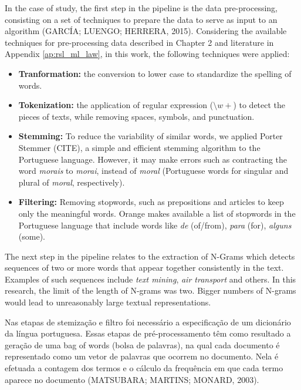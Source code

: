 In the case of study, the first step in the pipeline is the data pre-processing, consisting on a set of techniques to prepare the data to serve as input to an algorithm (GARCÍA; LUENGO; HERRERA, 2015). Considering the available techniques for pre-processing data described in Chapter 2 and literature in Appendix \ref{ap:rsl_ml_law}, in this work, the following techniques were applied:

\begin{itemize}
    \item \textbf{Tranformation:} the conversion to lower case to standardize the spelling of words.
    \item \textbf{Tokenization:} the application of regular expression ($\setminus w+$) to detect the pieces of texts, while removing spaces, symbols, and punctuation.
    \item \textbf{Stemming:} To reduce the variability of similar words, we applied Porter Stemmer (CITE), a simple and efficient stemming algorithm to the Portuguese language. However, it may make errors such as contracting the word \textit{morais} to \textit{morai}, instead of \textit{moral} (Portuguese words for singular and plural of \textit{moral}, respectively).
    \item \textbf{Filtering:} Removing stopwords, such as prepositions and articles to keep only the meaningful words. Orange makes available a list of stopwords in the Portuguese language that include words like \textit{de} (of/from), \textit{para} (for), \textit{alguns} (some).
\end{itemize}



The next step in the pipeline relates to the extraction of N-Grams which detects sequences of two or more words that appear together consistently in the text. Examples of such sequences include \textit{text mining}, \textit{air transport} and others. In this research, the limit of the length of N-grams was two. Bigger numbers of N-grams would lead to unreasonably large textual representations.



Nas etapas de stemização e filtro foi necessário a especificação de um dicionário da língua portuguesa.
Essas etapas de pré-processamento têm como resultado a geração de uma bag of words (bolsa de palavras), na qual cada documento é representado como um vetor de palavras que ocorrem no documento. Nela é efetuada a contagem dos termos e o cálculo da frequência em que cada termo aparece no documento (MATSUBARA; MARTINS; MONARD, 2003).

